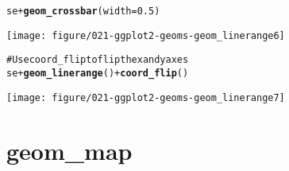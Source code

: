 \documentclass[a4paper,titlepage]{tufte-handout}\usepackage{graphicx, color}
\makeatletter
\def\maxwidth{ %
  \ifdim\Gin@nat@width>\linewidth
    \linewidth
  \else
    \Gin@nat@width
  \fi
}
\newcommand{\hlfunctioncall}[1]{\textcolor[rgb]{0.501960784313725,0,0.329411764705882}{\textbf{#1}}}%
\newcommand{\hlcomment}[1]{\textcolor[rgb]{0.180392156862745,0.6,0.341176470588235}{#1}}%
\newenvironment{kframe}{%
 \def\at@end@of@kframe{}%
 \ifinner\ifhmode%
  \def\at@end@of@kframe{\end{minipage}}%
  \begin{minipage}{\columnwidth}%
 \fi\fi%
 \def\FrameCommand##1{\hskip\@totalleftmargin \hskip-\fboxsep
 \colorbox{shadecolor}{##1}\hskip-\fboxsep
     \hskip-\linewidth \hskip-\@totalleftmargin \hskip\columnwidth}%
 \MakeFramed {\advance\hsize-\width
   \@totalleftmargin\z@ \linewidth\hsize
   \@setminipage}}%
 {\par\unskip\endMakeFramed%
 \at@end@of@kframe}
\newenvironment{knitrout}{}{} %
\makeatother
\begin{document}
\begin{knitrout}
\begin{kframe}
\begin{alltt}
se + \hlfunctioncall{geom_crossbar}(width = 0.5)
\end{alltt}
\end{kframe}\texttt{[image: figure/021-ggplot2-geoms-geom\_linerange6]} \begin{kframe}\begin{alltt}
\hlcomment{# Use coord_flip to flip the x and y axes}
se + \hlfunctioncall{geom_linerange}() + \hlfunctioncall{coord_flip}()
\end{alltt}
\end{kframe}\texttt{[image: figure/021-ggplot2-geoms-geom\_linerange7]} 
\end{knitrout}


\section{geom\_map}
\end{document}
